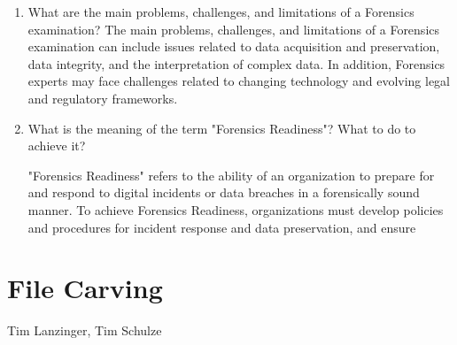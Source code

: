 \documentclass{scrreprt}
\begin{document}
\begin{enumerate}
\item What are the main problems, challenges, and limitations of a Forensics examination? 
The main problems, challenges, and limitations of a Forensics examination can include issues related to data acquisition and preservation, data integrity, and the interpretation of complex data. In addition, Forensics experts may face challenges related to changing technology and evolving legal and regulatory frameworks.
\item What is the meaning of the term "Forensics Readiness"? What to do to achieve it? 

"Forensics Readiness" refers to the ability of an organization to prepare for and respond to digital incidents or data breaches in a forensically sound manner. To achieve Forensics Readiness, organizations must develop policies and procedures for incident response and data preservation, and ensure
\end{enumerate}
\chapter{File Carving}
Tim Lanzinger, Tim Schulze
\end{document}
